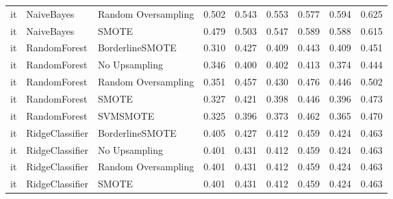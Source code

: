 \begin{tabular}{lllllllll}
      it &                      NaiveBayes &           Random Oversampling & 0.502 &                     0.543 &                 0.553 &                  0.577 &                                   0.594 &     0.625 \\
      it &                      NaiveBayes &                         SMOTE & 0.479 &                     0.503 &                 0.547 &                  0.589 &                                   0.588 &     0.615 \\
      it &                    RandomForest &               BorderlineSMOTE & 0.310 &                     0.427 &                 0.409 &                  0.443 &                                   0.409 &     0.451 \\
      it &                    RandomForest &                 No Upsampling & 0.346 &                     0.400 &                 0.402 &                  0.413 &                                   0.374 &     0.444 \\
      it &                    RandomForest &           Random Oversampling & 0.351 &                     0.457 &                 0.430 &                  0.476 &                                   0.446 &     0.502 \\
      it &                    RandomForest &                         SMOTE & 0.327 &                     0.421 &                 0.398 &                  0.446 &                                   0.396 &     0.473 \\
      it &                    RandomForest &                      SVMSMOTE & 0.325 &                     0.396 &                 0.373 &                  0.462 &                                   0.365 &     0.470 \\
      it &                 RidgeClassifier &               BorderlineSMOTE & 0.405 &                     0.427 &                 0.412 &                  0.459 &                                   0.424 &     0.463 \\
      it &                 RidgeClassifier &                 No Upsampling & 0.401 &                     0.431 &                 0.412 &                  0.459 &                                   0.424 &     0.463 \\
      it &                 RidgeClassifier &           Random Oversampling & 0.401 &                     0.431 &                 0.412 &                  0.459 &                                   0.424 &     0.463 \\
      it &                 RidgeClassifier &                         SMOTE & 0.401 &                     0.431 &                 0.412 &                  0.459 &                                   0.424 &     0.463 \\

\end{tabular}
